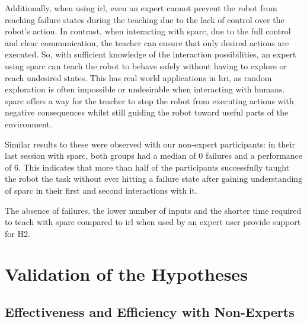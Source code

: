 Additionally, when using \gls{irl}, even an expert cannot prevent the robot from reaching failure states during the teaching due to the lack of control over the robot's action. In contrast, when interacting with \gls{sparc}, due to the full control and clear communication, the teacher can ensure that only desired actions are executed. So, with sufficient knowledge of the interaction possibilities, an expert using \gls{sparc} can teach the robot to behave safely without having to explore or reach undesired states. This has real world applications in \gls{hri}, as random exploration is often impossible or undesirable when interacting with humans. \gls{sparc} offers a way for the teacher to stop the robot from executing actions with negative consequences whilst still guiding the robot toward useful parts of the environment.

Similar results to these were observed with our non-expert participants: in their last session with \gls{sparc}, both groups had a median of 0 failures and a performance of 6. This indicates that more than half of the participants successfully taught the robot the task without ever hitting a failure state after gaining understanding of \gls{sparc} in their first and second interactions with it.

The absence of failures, the lower number of inputs and the shorter time required to teach with \gls{sparc} compared to \gls{irl} when used by an expert user provide support for H2.

\section{Validation of the Hypotheses}

\subsection{Effectiveness and Efficiency with Non-Experts}

